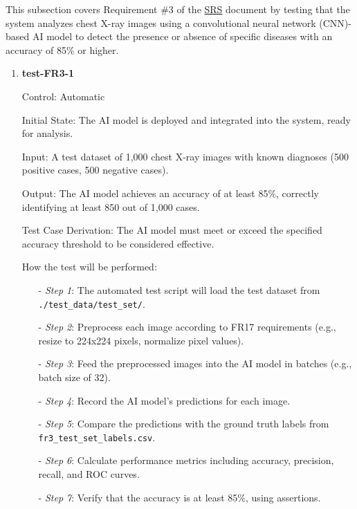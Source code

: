 \documentclass[12pt, titlepage]{article}
\begin{document}
This subsection covers Requirement \#3 of the \href{https://github.com/RezaJodeiri/CXR-Capstone/blob/main/docs/SRS/SRS.pdf}{SRS} \citep{SRS}
document by testing that the system analyzes chest X-ray images using a convolutional neural network (CNN)-based AI model to detect the presence or absence of specific diseases with an accuracy of 85\% or higher.

\begin{enumerate}

\item \textbf{test-FR3-1} \label{test-FR3-1}

Control: Automatic

Initial State: The AI model is deployed and integrated into the system, ready for analysis.

Input: A test dataset of 1,000 chest X-ray images with known diagnoses (500 positive cases, 500 negative cases).

Output: The AI model achieves an accuracy of at least 85\%, correctly identifying at least 850 out of 1,000 cases.

Test Case Derivation: The AI model must meet or exceed the specified accuracy threshold to be considered effective.

How the test will be performed:
\begin{itemize}
  \item[-] \textit{Step 1}: The automated test script will load the test dataset from \texttt{./test\_data/test\_set/}.
  \item[-] \textit{Step 2}: Preprocess each image according to FR17 requirements (e.g., resize to 224x224 pixels, normalize pixel values).
  \item[-] \textit{Step 3}: Feed the preprocessed images into the AI model in batches (e.g., batch size of 32).
  \item[-] \textit{Step 4}: Record the AI model's predictions for each image.
  \item[-] \textit{Step 5}: Compare the predictions with the ground truth labels from \texttt{fr3\_test\_set\_labels.csv}.
  \item[-] \textit{Step 6}: Calculate performance metrics including accuracy, precision, recall, and ROC curves.
  \item[-] \textit{Step 7}: Verify that the accuracy is at least 85\%, using assertions.
\end{itemize}

\end{enumerate}
\end{document}
